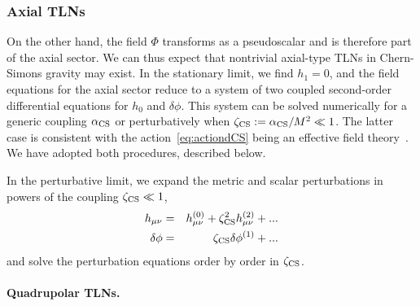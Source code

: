 \documentclass[aps,twocolumn,showpacs,preprintnumbers,nofootinbib,prd,superscriptaddress,groupedaddress,10pt]{revtex4-1}
\newcommand{\beq}{\begin{eqnarray}}
\newcommand{\eeq}{\end{eqnarray}}
\begin{document}
\subsubsection{Axial TLNs}

On the other hand, the field $\Phi$ transforms as a pseudoscalar and is therefore part of the axial sector. We can thus expect that nontrivial axial-type TLNs in Chern-Simons gravity may exist.  
In the stationary limit, we find $h_1=0$, and the field equations for the axial sector reduce to a system of two coupled second-order differential equations for $h_0$ and $\delta\phi$. 
%
This system can be solved numerically for a generic coupling $\alpha_{\rm CS}$ or perturbatively when $\zeta_{\rm CS}:=\alpha_{\rm CS}/M^2\ll1$. The latter case is consistent with the action~\eqref{eq:actiondCS} being an effective field theory~\cite{Alexander:2009tp}. We have adopted both procedures, described below.

In the perturbative limit, we expand the metric and scalar perturbations in powers of the coupling $\zeta_{\rm CS}\ll 1$,
%
\beq
h_{\mu\nu}&=&h_{\mu\nu}^{(0)}+\zeta_{\rm CS}^2h_{\mu\nu}^{(2)}+...\\
%
\delta\phi&=&\zeta_{\rm CS}\delta\phi^{(1)}+...
\eeq
%
and solve the perturbation equations order by order in $\zeta_{\rm CS}$.

\paragraph{Quadrupolar TLNs.}
\end{document}
